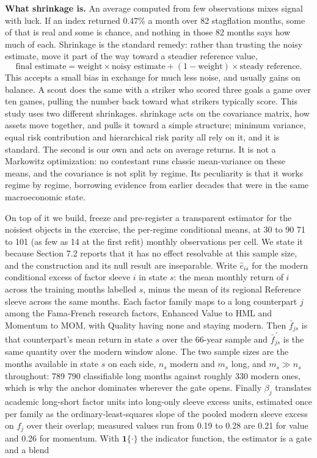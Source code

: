 \documentclass[12pt,letterpaper]{article}
\newcommand{\quita}[1]{{\color{quitarc}#1}}
\newcommand{\nuevo}[1]{{\color{nuevoc}#1}}
\newenvironment{nuevotexto}{\par\color{nuevoc}}{\par}
\newcommand{\head}[1]{\noindent\textbf{#1}\hspace{0.5em}\ignorespaces}
\begin{document}
\begin{nuevotexto}
\head{What shrinkage is.} An average computed from few observations mixes signal with luck. If an
index returned 0.47\% a month over 82 stagflation months, some of that is real and some is chance,
and nothing in those 82 months says how much of each. Shrinkage is the standard remedy: rather than
trusting the noisy estimate, move it part of the way toward a steadier reference value,
\[
\text{final estimate} = \text{weight} \times \text{noisy estimate} + (1-\text{weight}) \times
\text{steady reference}.
\]
This accepts a small bias in exchange for much less noise, and usually gains on balance. A
scout does the same with a striker who scored three goals a game over ten games, pulling the number
back toward what strikers typically score. This study uses two different shrinkages.
\citet{ledoit2004} shrinkage acts on the covariance matrix, how assets move together, and pulls it
toward a simple structure; minimum variance, equal risk contribution and hierarchical risk parity
all rely on it, and it is standard. The second is our own and acts on average returns. It is not a
Markowitz optimization: no contestant runs classic mean-variance on these means, and the covariance
is not split by regime. Its peculiarity is that it works regime by regime, borrowing evidence from
earlier decades that were in the same macroeconomic state.
\end{nuevotexto}

On top of it we build, freeze and pre-register a transparent estimator for the
noisiest objects in the exercise, the per-regime conditional means, at \quita{30 to 90} \nuevo{71 to 101 (as few as 14 at the first refit)}
monthly observations per cell. We state it because Section 7.2 reports that it has
no effect resolvable at this sample size, and the construction and its
null result are inseparable. Write $\hat{e}_{is}$ for the modern conditional excess of factor sleeve $i$ in state $s$:
the mean monthly return of $i$ across the training months labelled $s$, minus the mean of its
regional Reference sleeve across the same months. Each factor family maps to a long counterpart
$j$ among the Fama-French research factors, Enhanced Value to HML and Momentum to MOM, with
Quality having none and staying modern. Then $\bar{f}_{js}$ is that counterpart's mean return in
state $s$ over the 66-year sample and $\bar{f}^{\,\prime}_{js}$ is the same quantity over the
modern window alone. The two sample sizes are the months available in state $s$ on each side,
$n_s$ modern and $m_s$ long, and $m_s \gg n_s$ throughout: \quita{789} \nuevo{790} classifiable long months against
roughly 330 modern ones, which is why the anchor dominates wherever the gate opens. Finally
$\beta_j$ translates academic long-short factor units into long-only sleeve excess units,
estimated once per family as the ordinary-least-squares slope of the pooled modern sleeve excess
on $f_j$ over their overlap; measured values \quita{run from 0.19 to 0.28} \nuevo{are 0.21 for value and 0.26 for momentum}. With $\mathbf{1}\{\cdot\}$
the indicator function, the estimator is a gate and a blend
\end{document}
